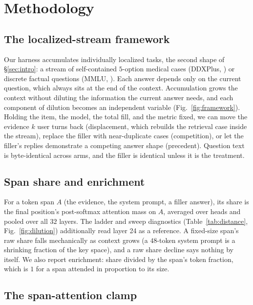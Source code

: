\documentclass{article}
\begin{document}
\section{Methodology}
\label{sec:method}

\subsection{The localized-stream framework}
\label{sec:framework}

Our harness accumulates individually localized tasks, the second shape of \S\ref{sec:intro}: a
stream of self-contained
$5$-option medical cases (DDXPlus, \citealp{tchango2022ddxplus}) or discrete factual questions
(MMLU, \citealp{hendrycks2021mmlu}). Each answer depends only on the current question,
which always sits at the end of the context. Accumulation grows the context without diluting the information the current answer
needs, and each component of dilution becomes an independent variable
(Fig.~\ref{fig:framework}). Holding the item, the model, the total fill, and the metric fixed,
we can move the evidence $k$ user turns back (displacement, which rebuilds the retrieval
case inside the stream), replace the filler with
near-duplicate cases (competition), or let the filler's replies demonstrate a competing
answer shape (precedent). Question text is byte-identical across arms, and the filler is
identical unless it is the treatment.

\subsection{Span share and enrichment}
\label{sec:share}

For a token span $A$ (the evidence, the system prompt, a filler answer), its share is the
final position's post-softmax attention mass on $A$, averaged over heads and pooled over all
$32$ layers. The ladder and sweep diagnostics (Table~\ref{tab:distance}, Fig.~\ref{fig:dilution})
additionally read layer 24 as a reference. A fixed-size span's raw share falls
mechanically as context grows (a $48$-token system prompt is a shrinking fraction of the key
space), and a raw share decline says nothing by itself. We also report
enrichment: share divided by the span's token fraction, which is $1$ for a span attended
in proportion to its size.

\subsection{The span-attention clamp}
\label{sec:clamp}
\end{document}
